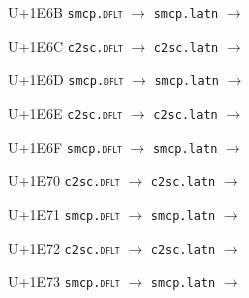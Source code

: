 \documentclass{article}
\begin{document}
\begin{substitutions}
\goodbreak

U+1E6B  \linebreak
    \texttt{smcp.\textsc{dflt}} $\to$  \linebreak
    \texttt{smcp.latn} $\to$  

\goodbreak

U+1E6C  \linebreak
    \texttt{c2sc.\textsc{dflt}} $\to$  \linebreak
    \texttt{c2sc.latn} $\to$  

\goodbreak

U+1E6D  \linebreak
    \texttt{smcp.\textsc{dflt}} $\to$  \linebreak
    \texttt{smcp.latn} $\to$  

\goodbreak

U+1E6E  \linebreak
    \texttt{c2sc.\textsc{dflt}} $\to$  \linebreak
    \texttt{c2sc.latn} $\to$  

\goodbreak

U+1E6F  \linebreak
    \texttt{smcp.\textsc{dflt}} $\to$  \linebreak
    \texttt{smcp.latn} $\to$  

\goodbreak

U+1E70  \linebreak
    \texttt{c2sc.\textsc{dflt}} $\to$  \linebreak
    \texttt{c2sc.latn} $\to$  

\goodbreak

U+1E71  \linebreak
    \texttt{smcp.\textsc{dflt}} $\to$  \linebreak
    \texttt{smcp.latn} $\to$  

\goodbreak

U+1E72  \linebreak
    \texttt{c2sc.\textsc{dflt}} $\to$  \linebreak
    \texttt{c2sc.latn} $\to$  

\goodbreak

U+1E73  \linebreak
    \texttt{smcp.\textsc{dflt}} $\to$  \linebreak
    \texttt{smcp.latn} $\to$  


\end{substitutions}
\end{document}
